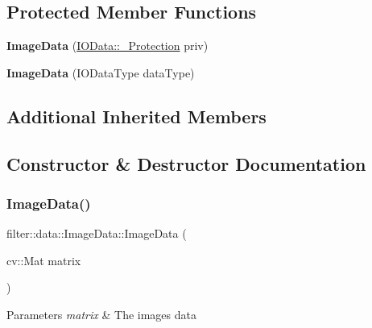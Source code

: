 \subsection*{Protected Member Functions}
\begin{DoxyCompactItemize}
\item 
\mbox{\label{classfilter_1_1data_1_1_image_data_aa1a881853016f3ce06d3fdeac8e3a875}} 
{\bfseries Image\+Data} (\hyperlink{classfilter_1_1data_1_1_i_o_data_1_1___protection}{I\+O\+Data\+::\+\_\+\+Protection} priv)
\item 
\mbox{\label{classfilter_1_1data_1_1_image_data_a3e56635b65d792a87554d635c8b20d1e}} 
{\bfseries Image\+Data} (I\+O\+Data\+Type data\+Type)
\end{DoxyCompactItemize}
\subsection*{Additional Inherited Members}


\subsection{Constructor \& Destructor Documentation}
\mbox{\label{classfilter_1_1data_1_1_image_data_ae34694d9ed284c8c85d4a67a52f09f12}} 
\subsubsection{\texorpdfstring{Image\+Data()}{ImageData()}}
{\footnotesize\ttfamily filter\+::data\+::\+Image\+Data\+::\+Image\+Data (\begin{DoxyParamCaption}\item[{cv\+::\+Mat}]{matrix }\end{DoxyParamCaption})\hspace{0.3cm}{\ttfamily [inline]}}


\begin{DoxyParams}{Parameters}
{\em matrix} & The image\textquotesingle{}s data \\
\hline
\end{DoxyParams}


